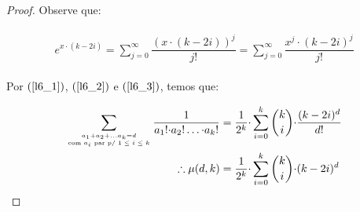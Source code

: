 \begin{proof}
	Observe que:
	
	\begin{align}
		\begin{split}
			\label{l6_3}
			e^{x {\cdot}(k - 2i)} = \sum\limits_{j = 0}^{\infty} \dfrac{(x {\cdot}(k - 2i))^j}{j!} = \sum\limits_{j = 0}^{\infty} \dfrac{x^j {\cdot}(k - 2i)^j}{j!}
		\end{split} 
	\end{align}
	
	Por $(\ref{l6_1})$, $(\ref{l6_2})$ e $(\ref{l6_3})$, temos que:
	
	\begin{align}
		\begin{split} 
			\sum\limits_{a_1 + a_2 + \ldots a_k = d \atop \text{com $a_i$ par p/ $1 \leq i \leq k$}} \dfrac{1}{a_1! {\cdot} a_2! \ldots {\cdot} a_k!} &= \dfrac{1}{2^k} {\cdot} \sum\limits_{i = 0}^{k}\escolhe{k}{i} {\cdot} \dfrac{(k - 2i)^{d}}{d!} \\
			\therefore \mu(d, k) &= \dfrac{1}{2^k} {\cdot} \sum\limits_{i = 0}^{k}\escolhe{k}{i} {\cdot} (k - 2i)^{d}
		\end{split} 
	\end{align}
	
\end{proof}


